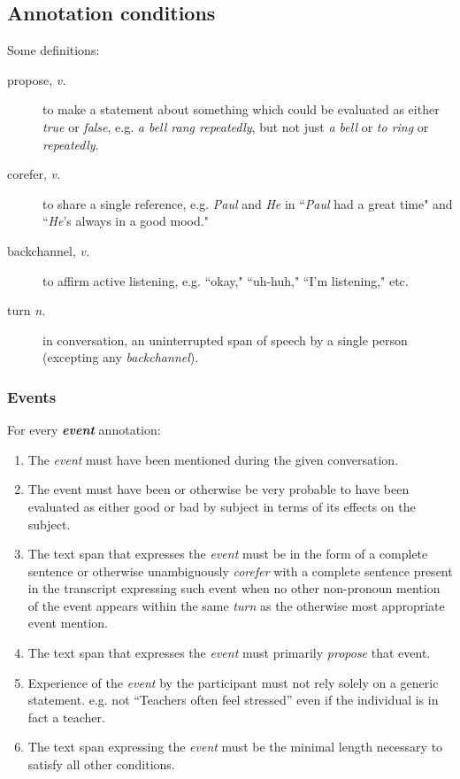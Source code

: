 \documentclass[a4paper,12pt]{article}
\begin{document}
    \newpage
    \subsection{Annotation conditions} \label{conditions}
        Some definitions:
        \begin{description}
            \item[propose, \emph{v.}] to make a statement about something which could be evaluated as either \emph{true} or \emph{false},
                e.g. \emph{a bell rang repeatedly}, but not just \emph{a bell} or \emph{to ring} or \emph{repeatedly}.
            \item[corefer, \emph{v.}] to share a single reference,
                e.g. \emph{Paul} and \emph{He} in ``\emph{Paul} had a great time" and ``\emph{He}'s always in a good mood."
            \item[backchannel, \emph{v.}] to affirm active listening, e.g. ``okay," ``uh-huh," ``I'm listening," etc.
            \item[turn \emph{n.}] in conversation, an uninterrupted span of speech by a single person (excepting any \emph{backchannel}).
        \end{description}
    \subsubsection{Events}
    For every \textbf{\emph{event}} annotation:
        \begin{enumerate}
            \item The \emph{event} must have been mentioned during the given conversation.
            \item The event must have been or otherwise be very probable to have been evaluated as either good or bad by subject in terms of its effects on the subject.
            \item The text span that expresses the \emph{event} must be in the form of a complete sentence or otherwise unambiguously \emph{corefer} with a complete sentence present in the transcript expressing such event when no other non-pronoun mention of the event appears within the same \emph{turn} as the otherwise most appropriate event mention.
            \item The text span that expresses the \emph{event} must primarily \emph{propose} that event. %
            \item Experience of the \emph{event} by the participant must not rely solely on a generic statement.
                e.g. not ``Teachers often feel stressed'' even if the individual is in fact a teacher.
            \item The text span expressing the \emph{event} must be the minimal length necessary to satisfy all other conditions.
        \end{enumerate}
\end{document}
